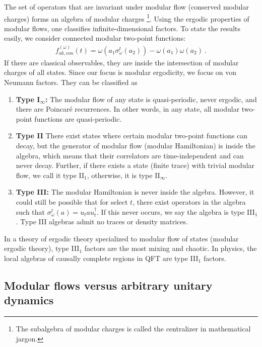 \documentclass[a4paper,11pt]{article}
\theoremstyle{definition}
\begin{document}
The set of operators that are invariant under modular flow (conserved modular charges) forms an algebra of modular charges \footnote{The subalgebra of modular charges is called {the centralizer} in mathematical jargon.}. Using the ergodic properties of modular flows, one classifies infinite-dimensional factors. To state the results easily, we consider connected modular two-point functions:
\begin{align}
    f_{ab,con}^{(\omega)}(t)=\omega(a_1 \sigma_\omega^t(a_2))-\omega(a_1)\omega(a_2)\ .
\end{align}
If there are classical observables, they are inside the intersection of modular charges of all states. Since our focus is modular ergodicity, we focus on von Neumann factors. They can be classified as
\begin{enumerate}
    \item {\bf Type I$_\infty$:} The modular flow of any state is quasi-periodic, never ergodic, and there are Poincaré recurrences. In other words, in any state, all modular two-point functions are quasi-periodic.
    \item {\bf Type II} There exist states where certain modular two-point functions can decay, but the generator of modular flow (modular Hamiltonian) is inside the algebra, which means that their correlators are time-independent and can never decay. Further, if there exists a state (finite trace) with trivial modular flow, we call it type II$_1$, otherwise, it is type II$_\infty$. 
    \item {\bf Type III:} The modular Hamiltonian is never inside the algebra. However, it could still be possible that for select $t$, there exist operators in the algebra such that $\sigma_\omega^t(a)=u_t a u_t^\dagger$. If this never occurs, we say the algebra is type III$_1$. Type III algebras admit no traces or density matrices.
\end{enumerate}
In a theory of ergodic theory specialized to modular flow of states (modular ergodic theory), type III$_1$ factors are the most mixing and chaotic. In physics, the local algebras of causally complete regions in QFT are type III$_1$ factors. 


\subsection{Modular flows versus arbitrary unitary dynamics}\label{sec:modular-vs-dynamics}
\end{document}
